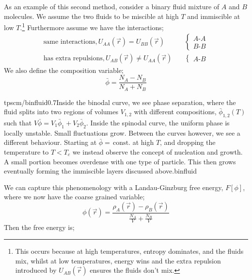 As an example of this second method, consider a binary fluid mixture of $A$ and $B$ molecules. We assume the two fluids to be miscible at high $T$ and immiscible at low $T$.\footnote{This occurs because at high temperatures, entropy dominates, and the fluids mix, whilst at low temperatures, energy wins and the extra repulsion introduced by $U_{AB}(\vec r)$ ensures the fluids don't mix.} Furthermore assume we have the interactions;
\begin{align*}
\text{same interactions,} \, U_{AA}(\vec r) = U_{BB}(\vec r)&\quad\begin{cases}A\text{-}A \\ B\text{-}B\end{cases} \\
\text{has extra repulsions,} \, U_{AB}(\vec r) \neq U_{AA}(\vec r)&\quad\begin{cases}A\text{-}B\end{cases}	
\end{align*}
We also define the composition variable;
\begin{equation}
\bar{\phi} = \frac{N_A - N_B}{N_A + N_B}
\end{equation}
\begin{mygraphic}{tpscm/binfluid}{0.7}{Inside the binodal curve, we see phase separation, where the fluid splits into two regions of volumes $V_{1, 2}$ with different compositions, $\bar{\phi}_{1,2}(T)$ such that $V \bar{\phi} = V_1 \bar{\phi}_1 + V_2\bar{\phi}_2$. Inside the spinodal curve, the uniform phase is locally unstable. Small fluctuations grow. Between the curves however, we see a different behaviour. Starting at $\bar{\phi} = \,\text{const.}$ at high $T$, and dropping the temperature to $T < T_c$ we instead observe the concept of nucleation and growth. A small portion becomes overdense with one type of particle. This then grows eventually forming the immiscible layers discussed above.}{binfluid}\end{mygraphic}
We can capture this phenomenology with a Landau-Ginzburg free energy, $F[\phi]$, where we now have the coarse grained variable;
\begin{equation}
\phi(\vec r) = \frac{\rho_A(\vec r) - \rho_B(\vec r)}{\tfrac{N_A}{V} + \tfrac{N_B}{V}}
\end{equation}
Then the free energy is;\footnotemark
{}
